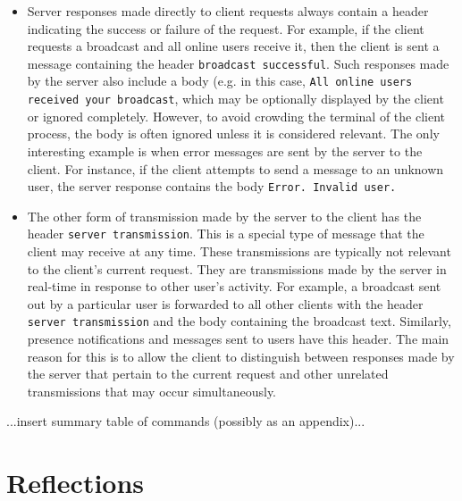 \documentclass[12pt,a4paper]{article}
\begin{document}
\begin{itemize}
	\item Server responses made directly to client requests always contain a header indicating the success or failure of the request. For example, if the client requests a broadcast and all online users receive it, then the client is sent a message containing the header \verb|broadcast successful|. Such responses made by the server also include a body (e.g. in this case, \verb|All online users received your broadcast|, which may be optionally displayed by the client or ignored completely. However, to avoid crowding the terminal of the client process, the body is often ignored unless it is considered relevant. The only interesting example is when error messages are sent by the server to the client. For instance, if the client attempts to send a message to an unknown user, the server response contains the body \verb|Error. Invalid user.|
	\item The other form of transmission made by the server to the client has the header \verb|server transmission|. This is a special type of message that the client may receive at any time. These transmissions are typically not relevant to the client's current request. They are transmissions made by the server in real-time in response to other user's activity. For example, a broadcast sent out by a particular user is forwarded to all other clients with the header \verb|server transmission| and the body containing the broadcast text. Similarly, presence notifications and messages sent to users have this header. The main reason for this is to allow the client to distinguish between responses made by the server that pertain to the current request and other unrelated transmissions that may occur simultaneously.
\end{itemize}
...insert summary table of commands (possibly as an appendix)...

\section{Reflections}
\label{sec:reflections}
\end{document}
